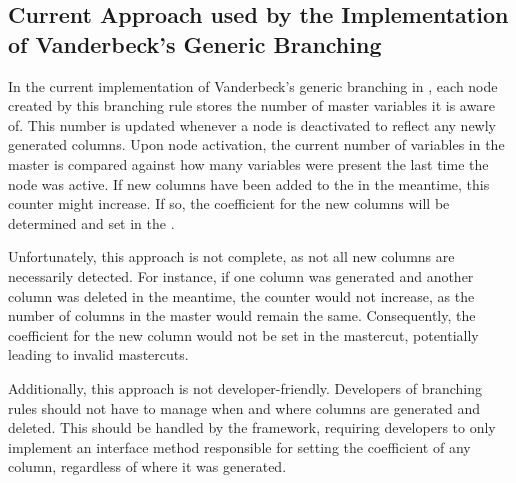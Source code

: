 \subsection{Current Approach used by the Implementation of Vanderbeck's Generic Branching}\label{subsec:gm_sync_current}
In the current implementation of Vanderbeck's generic branching in \GCG{}, each node created by this branching rule stores the number of master variables it is aware of. This number is updated whenever a node is deactivated to reflect any newly generated columns. Upon node activation, the current number of variables in the master is compared against how many variables were present the last time the node was active. If new columns have been added to the \RMP{} in the meantime, this counter might increase. If so, the coefficient for the new columns will be determined and set in the \RMP{}.

Unfortunately, this approach is not complete, as not all new columns are necessarily detected. For instance, if one column was generated and another column was deleted in the meantime, the counter would not increase, as the number of columns in the master would remain the same. Consequently, the coefficient for the new column would not be set in the mastercut, potentially leading to invalid mastercuts.

Additionally, this approach is not developer-friendly. Developers of branching rules should not have to manage when and where columns are generated and deleted. This should be handled by the framework, requiring developers to only implement an interface method responsible for setting the coefficient of any column, regardless of where it was generated.

